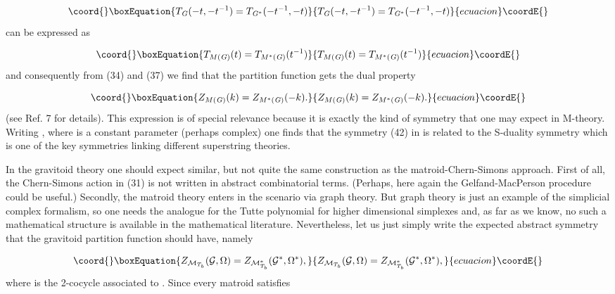 \documentclass[a4paper,12pt]{article}
\begin{document}
\begin{equation}\coord{}\boxEquation{
T_{\mathit{G}}(-t,-t^{-1})=T_{\mathit{G}^{\ast }}(-t^{-1},-t)  \label{40}
}{
T_{\mathit{G}}(-t,-t^{-1})=T_{\mathit{G}^{\ast }}(-t^{-1},-t)  }{ecuacion}\coordE{}\end{equation}
can be expressed as

\begin{equation}\coord{}\boxEquation{
T_{M(\mathit{G)}}(t)=T_{M^{\ast }(\mathit{G)}}(t^{-1})  \label{41}
}{
T_{M(\mathit{G)}}(t)=T_{M^{\ast }(\mathit{G)}}(t^{-1})  }{ecuacion}\coordE{}\end{equation}
and consequently from (34) and (37) we find that the partition function \coordHE{} gets the dual property

\begin{equation}\coord{}\boxEquation{
Z_{M(\mathit{G)}}(k)=Z_{M^{\ast }(\mathit{G)}}(-k).  \label{42}
}{
Z_{M(\mathit{G)}}(k)=Z_{M^{\ast }(\mathit{G)}}(-k).  }{ecuacion}\coordE{}\end{equation}
(see Ref. 7 for details). This expression is of special relevance because it
is exactly the kind of symmetry that one may expect in M-theory. Writing \coordHE{}, where \myHighlight{$\tau $}\coordHE{} is a constant parameter (perhaps complex) one
finds that the symmetry (42) in \coordHE{} is related to the
S-duality symmetry \coordHE{} which is one of the
key symmetries linking different superstring theories.

In the gravitoid theory one should expect similar, but not quite the same
construction as the matroid-Chern-Simons approach. First of all, the
Chern-Simons action in (31) is not written in abstract combinatorial terms.
(Perhaps, here again the Gelfand-MacPerson\coordHE{} procedure could be
useful.) Secondly, the matroid theory enters in the scenario via graph
theory. But graph theory is just an example of the simplicial complex
formalism, so one needs the analogue for the Tutte polynomial for higher
dimensional simplexes and, as far as we know, no such a mathematical
structure is available in the mathematical literature. Nevertheless, let us
just simply write the expected abstract symmetry that the gravitoid
partition function should have, namely

\begin{equation}\coord{}\boxEquation{
Z_{\mathcal{M}_{T_{b}}}(\mathcal{G},\Omega )=Z_{\mathcal{M}_{T_{b}}^{\ast }}(
\mathcal{G}^{\ast },\Omega ^{\ast }),  \label{43}
}{
Z_{\mathcal{M}_{T_{b}}}(\mathcal{G},\Omega )=Z_{\mathcal{M}_{T_{b}}^{\ast }}(
\mathcal{G}^{\ast },\Omega ^{\ast }),  }{ecuacion}\coordE{}\end{equation}
where \myHighlight{$\Omega ^{\ast }$}\coordHE{} is the 2-cocycle associated to \coordHE{}%
. Since every matroid \coordHE{} satisfies
\end{document}
